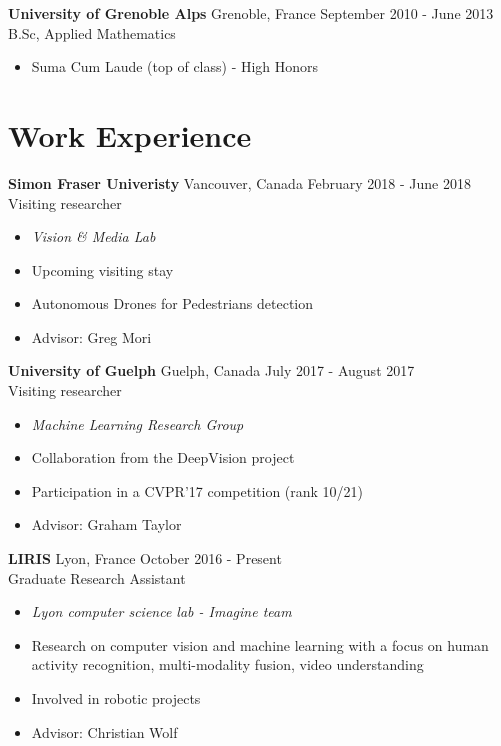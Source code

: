 \documentclass[10pt]{res} %
\begin{document}
\begin{resume}
\textbf{University of Grenoble Alps} \hfill Grenoble, France \hfill September 2010 - June 2013 \\
B.Sc, Applied Mathematics
\begin{itemize}
\item Suma Cum Laude (top of class) - High Honors
\end{itemize}
 

\section{\large Work Experience} 

\textbf{Simon Fraser Univeristy} \hfill Vancouver, Canada \hfill February 2018 - June 2018 \\
Visiting researcher
\begin{itemize}
\item \textit{Vision \& Media Lab}
\item Upcoming visiting stay
\item Autonomous Drones for Pedestrians detection
\item Advisor: Greg Mori
\end{itemize}

\textbf{University of Guelph} \hfill Guelph, Canada \hfill July 2017 - August 2017 \\
Visiting researcher
\begin{itemize}
\item \textit{Machine Learning Research Group}
\item Collaboration from the DeepVision project
\item Participation in a CVPR'17 competition (rank 10/21)
\item Advisor: Graham Taylor
\end{itemize}

\textbf{LIRIS} \hfill Lyon, France \hfill October 2016 - Present \\
Graduate Research Assistant
\begin{itemize}
\item \textit{Lyon computer science lab - Imagine team}  
\item Research on computer vision and machine learning with a focus on human activity recognition, multi-modality fusion, video understanding
\item Involved in robotic projects
\item Advisor: Christian Wolf
\end{itemize}


\end{resume}
\end{document}
